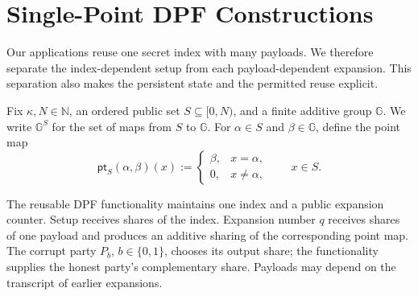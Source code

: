 \section{Single-Point DPF Constructions}\label{sec:dpf}

Our applications reuse one secret index with many payloads.  We therefore
separate the index-dependent setup from each payload-dependent expansion.  This
separation also makes the persistent state and the permitted reuse explicit.

Fix $\kappa,N\in\mathbb N$, an ordered public set $S\subseteq[0,N)$, and a
finite additive group $\mathbb G$.
We write $\mathbb G^S$ for the set of maps from $S$ to $\mathbb G$.  For
$\alpha\in S$ and $\beta\in\mathbb G$, define the point map
\[
 \mathsf{pt}_{S}(\alpha,\beta)(x):=
 \begin{cases}
  \beta,&x=\alpha,\\
  0,&x\neq\alpha,
 \end{cases}
 \qquad x\in S.
\]

The reusable DPF functionality maintains one index and a public expansion
counter.  Setup receives shares of the index.  Expansion number $q$ receives
shares of one payload and produces an additive sharing of the corresponding
point map.  The corrupt party $P_b$, $b\in\{0,1\}$, chooses its output share;
the functionality supplies the honest party's complementary share.
Payloads may depend on the transcript of earlier expansions.


